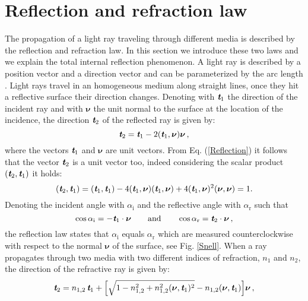 \section{Reflection and refraction law}
The propagation of a light ray traveling through  different media is described by the reflection and refraction law.
In this section we introduce these two laws and we explain the total internal reflection phenomenon.
A light ray is described by a position vector  and a direction vector  and can be parameterized by the arc length .
Light rays travel in an homogeneous medium along straight lines, once they hit a reflective surface their direction changes.
 Denoting with $\textit{\textbf{t}}_1$ the direction of the incident ray and with $\boldsymbol{\nu}$ the unit normal to the surface at the location of the incidence, the direction $\textit{\textbf{t}}_2$ of the reflected ray is given by:
 \begin{equation}\label{Reflection}
  \textit{\textbf{t}}_2 = \textit{\textbf{t}}_1-2(\textit{\textbf{t}}_1,\boldsymbol{\nu})\boldsymbol{\nu}\,,
\end{equation}
where the vectors $\textit{\textbf{t}}_1$ and $\boldsymbol{\nu}$ are unit vectors. 
From Eq. (\ref{Reflection}) it follows that the vector  $\textit{\textbf{t}}_2$ is a unit vector too, indeed considering the scalar product $(\textit{\textbf{t}}_2,\textit{\textbf{t}}_1)$ it holds:
\begin{equation}\label{unit_vector}
(\textit{\textbf{t}}_2,\textit{\textbf{t}}_1) = (\textit{\textbf{t}}_1,\textit{\textbf{t}}_1) - 4(\textit{\textbf{t}}_1,\boldsymbol{\nu})(\textit{\textbf{t}}_1,\boldsymbol{\nu})+
4(\textit{\textbf{t}}_1,\boldsymbol{\nu})^2(\boldsymbol{\nu},\boldsymbol{\nu})=1 .
\end{equation} 
Denoting the incident angle with $\alpha_{\textrm{i}}$ and the reflective angle with $\alpha_\textrm{r}$ such that
\begin{equation}
\cos{\alpha_{\textrm{i}}} = -\textit{\textbf{t}}_1\cdot \boldsymbol{\nu} \qquad \mbox{and} \qquad \cos{\alpha_{\textrm{r}}} = \textit{\textbf{t}}_2 \cdot\boldsymbol{\nu}\,,
\end{equation}
the reflection law states that $\alpha_\textrm{i}$ equals $\alpha_\textrm{r}$ which are measured counterclockwise with respect to the normal $\boldsymbol{\nu}$ of the surface, see Fig. \ref{Snell}.
When a ray propagates through two media with two different indices of refraction, $n_1$ and $n_2$, the direction of the refractive ray is given by:
\begin{equation}\label{Refraction}
\textit{\textbf{t}}_2 = n_{1,2}\,\textit{\textbf{t}}_1+
\Big[\sqrt{1-n_{1,2}^2+n_{1,2}^2(\boldsymbol{\nu},\textit{\textbf{t}}_1)^2}-n_{1,2}(\boldsymbol{\nu},\textit{\textbf{t}}_1) \Big]\boldsymbol{\nu}\,,
\end{equation}
